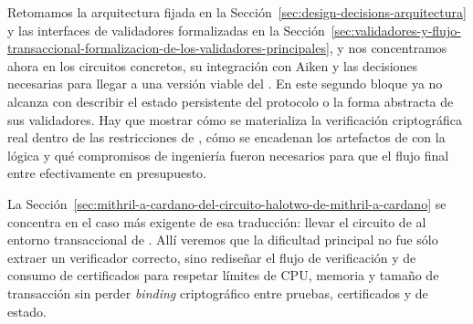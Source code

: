 
Retomamos la arquitectura fijada en la Sección~\ref{sec:design-decisions-arquitectura} y las interfaces de validadores formalizadas en la Sección~\ref{sec:validadores-y-flujo-transaccional-formalizacion-de-los-validadores-principales}, y nos concentramos ahora en los circuitos \ZK concretos, su integración con Aiken y las decisiones necesarias para llegar a una versión viable del \zkBridge. En este segundo bloque ya no alcanza con describir el estado persistente del protocolo o la forma abstracta de sus validadores. Hay que mostrar cómo se materializa la verificación criptográfica real dentro de las restricciones de \Cardano, cómo se encadenan los artefactos de \Mithril con la lógica \Onchain y qué compromisos de ingeniería fueron necesarios para que el flujo final entre efectivamente en presupuesto.

La Sección~\ref{sec:mithril-a-cardano-del-circuito-halotwo-de-mithril-a-cardano} se concentra en el caso más exigente de esa traducción: llevar el circuito \HaloTwo de \Mithril al entorno transaccional de \Cardano. Allí veremos que la dificultad principal no fue sólo extraer un verificador correcto, sino rediseñar el flujo de verificación y de consumo de certificados para respetar límites de CPU, memoria y tamaño de transacción sin perder \textit{binding} criptográfico entre pruebas, certificados y \UTxOs de estado.





